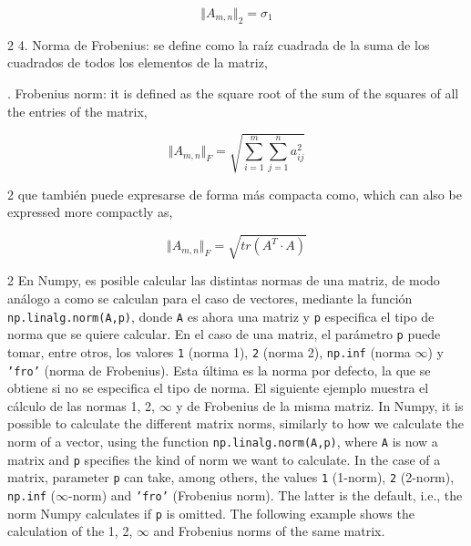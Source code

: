 \begin{equation*}
\Vert A_{m,n} \Vert _2 = \sigma_{1}
\end{equation*}
\begin{paracol}{2}
4. Norma de Frobenius: se define como la raíz cuadrada de la suma de los cuadrados de todos los elementos de la matriz,

. Frobenius norm: it is defined as the square root of the sum of the squares of all the entries of the matrix, 
\end{paracol}
\begin{equation*}
\Vert A_{m,n} \Vert _F =\sqrt{\sum_{i=1}^m \sum_{j=1}^n a_{ij}^2}
\end{equation*}
\begin{paracol}{2}
que también puede expresarse de forma más compacta como,
\switchcolumn
which can also be expressed more compactly as,
\end{paracol}
\begin{equation*}
\Vert A_{m,n} \Vert _F =\sqrt{tr(A^T\cdot A)}
\end{equation*}
\begin{paracol}{2}
En Numpy, es posible calcular las distintas normas de una matriz, de modo análogo a como se calculan para el caso de vectores, mediante la función \texttt{np.linalg.norm(A,p)}, donde \texttt{A} es ahora una matriz y \texttt{p} especifica el tipo de norma que se quiere calcular. En el caso de una matriz, el parámetro \texttt{p} puede tomar, entre otros, los valores \texttt{1} (norma 1), \texttt{2} (norma 2), \texttt{np.inf} (norma $\infty$) y \texttt{'fro'} (norma de Frobenius). Esta última es la norma por defecto, la que se obtiene si no se especifica el tipo de norma. El siguiente ejemplo muestra el cálculo de las normas 1, 2, $\infty$ y de Frobenius de la misma matriz.
\switchcolumn
In Numpy, it is possible to calculate the different matrix norms, similarly to how we calculate the norm of a vector, using the function \texttt{np.linalg.norm(A,p)}, where \texttt{A} is now a matrix and \texttt{p} specifies the kind of norm we want to calculate. In the case of a matrix, parameter \texttt{p} can take, among others, the values \texttt{1} (1-norm), \texttt{2} (2-norm), \texttt{np.inf} ($\infty$-norm) and \texttt{'fro'} (Frobenius norm). The latter is the default, i.e., the norm Numpy calculates if \texttt{p} is omitted. The following example shows the calculation of the 1, 2, $\infty$ and Frobenius norms of the same matrix.  
\end{paracol}
